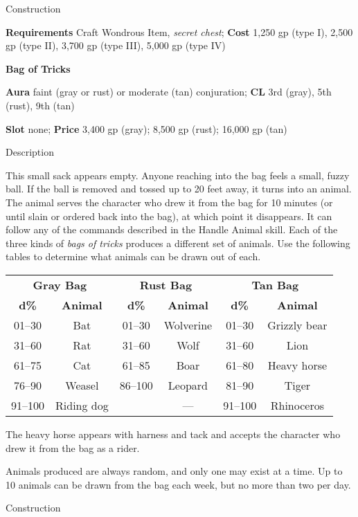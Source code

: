 Construction
				
\textbf{Requirements} Craft Wondrous Item, \textit{secret chest}; \textbf{Cost }1,250 gp (type I), 2,500 gp (type II), 3,700 gp (type III), 5,000 gp (type IV)
				
\textbf{Bag of Tricks}
				
\textbf{Aura} faint (gray or rust) or moderate (tan) conjuration; \textbf{CL} 3rd (gray), 5th (rust), 9th (tan)
				
\textbf{Slot} none; \textbf{Price} 3,400 gp (gray); 8,500 gp (rust); 16,000 gp (tan)
				
Description
				
This small sack appears empty. Anyone reaching into the bag feels a small, fuzzy ball. If the ball is removed and tossed up to 20 feet away, it turns into an animal. The animal serves the character who drew it from the bag for 10 minutes (or until slain or ordered back into the bag), at which point it disappears. It can follow any of the commands described in the Handle Animal skill. Each of the three kinds of \textit{bags of tricks }produces a different set of animals. Use the following tables to determine what animals can be drawn out of each.
				
\begin{tabular}{cccccc}
\multicolumn{2}{c}{\textbf{Gray Bag}} & \multicolumn{2}{c}{\textbf{Rust Bag}} & \multicolumn{2}{c}{\textbf{Tan Bag}}\\
\textbf{d\%} & \textbf{Animal} & \textbf{d\%} & \textbf{Animal} & \textbf{d\%} & \textbf{Animal}\\
 01--30 & Bat & 01--30 & Wolverine & 01--30 & Grizzly bear\\
 31--60 & Rat & 31--60 & Wolf & 31--60 & Lion\\
 61--75 & Cat & 61--85 & Boar & 61--80 & Heavy horse\\
 76--90 & Weasel & 86--100 & Leopard & 81--90 & Tiger\\
 91--100 & Riding dog & & --- & 91--100 & Rhinoceros\\
\end{tabular}
				
The heavy horse appears with harness and tack and accepts the character who drew it from the bag as a rider.
				
Animals produced are always random, and only one may exist at a time. Up to 10 animals can be drawn from the bag each week, but no more than two per day.
				
Construction
				
